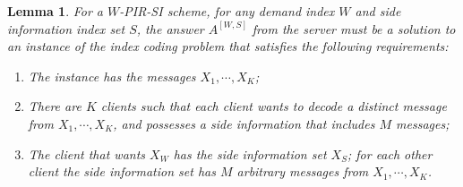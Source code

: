 \documentclass[letterpaper, 10 pt, conference]{ieeeconf}
\newcommand\swanand[1]{\notee[swanand]{#1}}
\newtheorem{lemma}{Lemma}
\newcommand{\A}[2]{A^{[#1,#2]}} %
\begin{document}



\begin{lemma}
\label{lem:necessary-condition}
For a $W$-PIR-SI scheme, for any demand index $W$ and side information index set $S$, the answer $\A{W}{S}$ from the server must be a solution to an instance of the index coding problem that satisfies the following requirements:
\begin{enumerate}
	\item The instance has the messages  $X_1, \cdots, X_K$;
	\item  There are $K$ clients such that each client wants to decode a distinct message from $X_1, \cdots, X_K$, and possesses a side information that includes $M$ messages;
	\item  The client that wants $X_W$ has the side information set $X_S$; for each other client the side information set has $M$ arbitrary messages from $X_1, \cdots, X_K$.
\end{enumerate}
%
%
\end{lemma}
\end{document}
